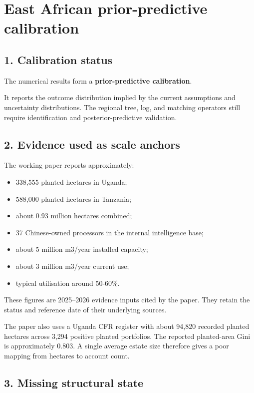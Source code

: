 \section{East African prior-predictive calibration}\label{east-african-prior-predictive-calibration}

\subsection{1. Calibration status}\label{calibration-status}

The numerical results form a \textbf{prior-predictive calibration}.

It reports the outcome distribution implied by the current assumptions and
uncertainty distributions. The regional tree, log, and matching operators still
require identification and posterior-predictive validation.

\subsection{2. Evidence used as scale anchors}\label{evidence-used-as-scale-anchors}

The working paper reports approximately:

\begin{itemize}
\tightlist
\item
  338,555 planted hectares in Uganda;
\item
  588,000 planted hectares in Tanzania;
\item
  about 0.93 million hectares combined;
\item
  37 Chinese-owned processors in the internal intelligence base;
\item
  about 5 million m3/year installed capacity;
\item
  about 3 million m3/year current use;
\item
  typical utilisation around 50-60\%.
\end{itemize}

These figures are 2025--2026 evidence inputs cited by the paper. They retain the
status and reference date of their underlying sources.

The paper also uses a Uganda CFR register with about 94,820 recorded planted
hectares across 3,294 positive planted portfolios. The reported planted-area
Gini is approximately 0.803. A single average estate size therefore gives a poor
mapping from hectares to account count.

\subsection{3. Missing structural state}\label{missing-structural-state}

